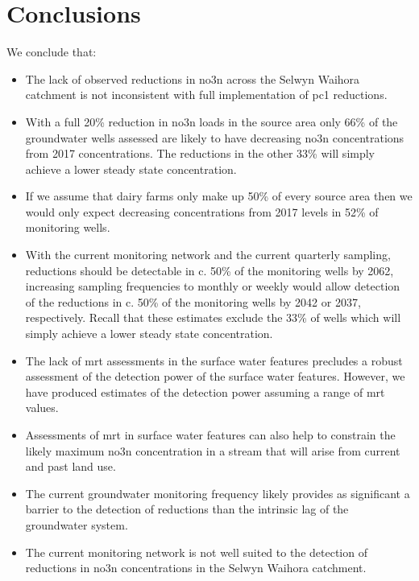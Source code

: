 
\section[Conclusions]{Conclusions} \label{sec:conclusions}

We conclude that:
\begin{itemize}
    \item The lack of observed reductions in \gls{no3n} across the Selwyn Waihora catchment is not inconsistent with full implementation of \gls{pc1} reductions.
    \item With a full 20\% reduction in \gls{no3n} loads in the source area only 66\% of the groundwater wells assessed are likely to have decreasing \gls{no3n} concentrations from 2017 concentrations. The reductions in the other 33\% will simply achieve a lower steady state concentration.
    \item If we assume that dairy farms only make up 50\% of every source area then we would only expect decreasing concentrations from 2017 levels in 52\% of monitoring wells.
    \item With the current monitoring network and the current quarterly sampling, reductions should be detectable in c. 50\% of the monitoring wells by 2062, increasing sampling frequencies to monthly or weekly would allow detection of the reductions in c. 50\% of the monitoring wells by 2042 or 2037, respectively. Recall that these estimates exclude the 33\% of wells which will simply achieve a lower steady state concentration.
    \item The lack of \gls{mrt} assessments in the surface water features precludes a robust assessment of the detection power of the surface water features. However, we have produced estimates of the detection power assuming a range of \gls{mrt} values.
    \item Assessments of \gls{mrt} in surface water features can also help to constrain the likely maximum \gls{no3n} concentration in a stream that will arise from current and past land use.
    \item The current groundwater monitoring frequency likely provides as significant a barrier to the detection of reductions than the intrinsic lag of the groundwater system.
    \item The current monitoring network is not well suited to the detection of reductions in \gls{no3n} concentrations in the Selwyn Waihora catchment.
\end{itemize}

